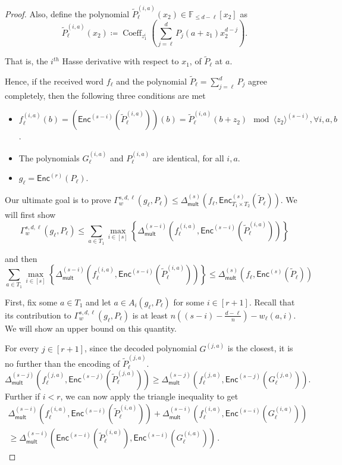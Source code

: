\documentclass{theoretics}
\def\Field{\mathbb{F}}
\let\F\Field
\renewcommand{\tilde}[1]{\widetilde{#1}}
\newcommand{\enc}{{\mathsf{Enc}}}
\newcommand{\encs}{{\mathsf{Enc}^{(s)}}}
\newcommand{\coeff}{\operatorname{Coeff}}
\newcommand{\Delm}{\Delta_{\mathsf{mult}}}
\begin{document}
\begin{proof}
		Also, define the polynomial $\tilde{P}_\ell^{(i,a)}(x_2)\in \F_{\leq d-\ell}[x_2]$ as  
		\[
		\tilde{P}_\ell^{(i,a)}(x_2) \coloneqq \coeff_{z_1^i}\left(\sum_{j=\ell}^{d}P_j\left(a+z_1\right)x_2^{d-j}\right).
		\]
		
		That is, the $i^{th}$ Hasse derivative with respect to $x_1$, of $\tilde{P}_\ell$ at $a$.
		
		Hence, if the received word $f_\ell$ and the polynomial $\tilde{P}_\ell = \sum_{j=\ell}
		^d P_j$ agree completely, then the following three conditions are met
		\begin{itemize}
			\item $f_\ell^{(i,a)}(b)=
			\left(\enc^{(s-i)}\left(\tilde{P}_{\ell}^{(i,a)}\right)\right)(b)=\tilde{P}_{\ell}^{(i,a)}\left(b+z_2\right)
			\mod \langle z_2 \rangle^{(s-i)}, \forall i,a,b$.
			\item The polynomials $G_\ell^{(i,a)}$ and $P_\ell^{(i,a)}$ are
			identical, for all $i,a$.
			\item $g_\ell= \enc^{(r)}(P_\ell)$.
		\end{itemize}    
		
		Our ultimate goal is to prove $\Gamma_{w}^{s, d, \ell}(g_{\ell}, P_{\ell}) \leq \Delm^{(s)}(f_\ell, \enc^{(s)}_{T_1\times T_2}(\tilde{P}_\ell))$. We will first show 
		\[ \Gamma_{w}^{s, d, \ell}(g_{\ell}, P_{\ell}) \leq \sum_{a \in T_1} \max_{i \in [s]} \left\{\Delm^{(s-i)} \left(f_{\ell}^{(i, a)}, \enc^{(s-i)}\left(\tilde{P}_{\ell}^{(i, a)}\right)\right)\right\} \]
		
		and then 
		\[ \sum_{a \in T_1} \max_{i \in [s]} \left\{\Delm^{(s-i)} \left(f_{\ell}^{(i, a)}, \enc^{(s-i)}\left(\tilde{P}_{\ell}^{(i, a)}\right)\right)\right\} \leq \Delm^{(s)} \left(f_\ell, \encs\left( \tilde{P}_\ell\right)\right) \]
		
		First, fix some $a \in T_1$ and let $a\in A_i \left(g_\ell, P_\ell\right)$ for some $i\in [r+1]$. Recall that its contribution to $\Gamma_{w}^{s, d, \ell}(g_{\ell}, P_{\ell})$ is at least $n\left((s-i) - \frac{d-\ell}n\right) - w_{\ell}(a,i)$. We will show an upper bound on this quantity.
		
		For every $j\in [r+1]$, since the decoded polynomial $G^{(j, a)}$ is the closest, it is no further than the encoding of $\tilde{P}_{\ell}^{(j, a)}$.
		\[ \Delm^{(s-j)} \left(f_{\ell}^{(j, a)}, \enc^{(s-j)}\left(\tilde{P}_{\ell}^{(j, a)}\right)\right) \geq  \Delm^{(s-j)} \left(f_{\ell}^{(j, a)}, \enc^{(s-j)}\left(G_{\ell}^{(j, a)} \right)\right). \] 
		Further if $i<r$, we can now apply the triangle inequality to get 
		\begin{multline*}\Delm^{(s-i)} \left(f_{\ell}^{(i, a)}, \enc^{(s-i)}\left(\tilde{P}_{\ell}^{(i,
			a)}\right)\right) + \Delm^{(s-i)} \left(f_{\ell}^{(i, a)},
		\enc^{(s-i)}\left(G_{\ell}^{(i, a)}\right)\right) \\
        \geq \Delm^{(s-i)}
		\left(\enc^{(s-i)}\left(\tilde{P}_{\ell}^{(i, a)}\right), \enc^{(s-i)}\left(G_{\ell}^{(i,
			a)}\right)\right)\,.\end{multline*}
		

\end{proof}
\end{document}
